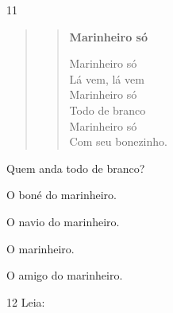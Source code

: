 







\num{11}

\begin{quote}
\begin{verse}
\textbf{Marinheiro só}

Marinheiro só\\
Lá vem, lá vem\\
Marinheiro só\\
Todo de branco\\
Marinheiro só\\
Com seu bonezinho.
\end{verse}

\end{quote}

Quem anda todo de branco?

\begin{multicols}{2}
\begin{escolha}
\item O boné do marinheiro.

\item O navio do marinheiro.

\item O marinheiro.

\item O amigo do marinheiro.
\end{escolha}
\end{multicols}

\pagebreak
\num{12} Leia:

